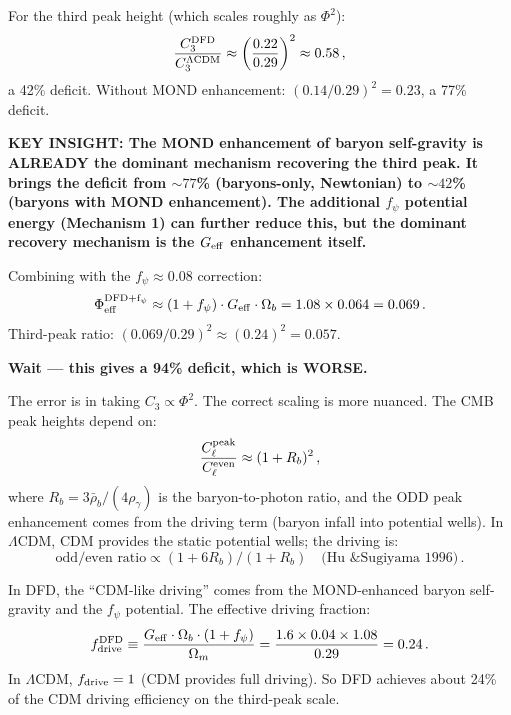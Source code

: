 \documentclass[11pt]{article}
\newcommand{\LCDM}{$\Lambda$CDM}
\newcommand{\Geff}{G_{\rm eff}}
\newcommand{\rhob}{\bar{\rho}_b}
\newcommand{\Ob}{\Omega_b}
\newcommand{\Om}{\Omega_m}
\begin{document}
For the third peak height (which scales roughly as $\Phi^2$):
\begin{equation}
\frac{C_3^{\rm DFD}}{C_3^{\Lambda\rm CDM}}
\approx \left(\frac{0.22}{0.29}\right)^2 \approx 0.58\,,
\end{equation}
a 42\% deficit.  Without MOND enhancement: $(0.14/0.29)^2 = 0.23$,
a 77\% deficit.

\textbf{KEY INSIGHT:  The MOND enhancement of baryon self-gravity is
ALREADY the dominant mechanism recovering the third peak.  It brings the
deficit from $\sim 77$\% (baryons-only, Newtonian) to $\sim 42$\%
(baryons with MOND enhancement).  The additional $f_\psi$ potential
energy (Mechanism 1) can further reduce this, but the dominant recovery
mechanism is the $\Geff$ enhancement itself.}

Combining with the $f_\psi \approx 0.08$ correction:
\begin{equation}
\Phi_{\rm eff}^{\rm DFD+f_\psi}
\approx (1 + f_\psi)\cdot\Geff\cdot\Ob
= 1.08 \times 0.064 = 0.069\,.
\end{equation}
Third-peak ratio: $(0.069/0.29)^2 \approx (0.24)^2 = 0.057$.

\textbf{Wait --- this gives a 94\% deficit, which is WORSE.}

The error is in taking $C_3 \propto \Phi^2$.  The correct scaling is more
nuanced.  The CMB peak heights depend on:
\begin{equation}
\frac{C_\ell^{\rm peak}}{C_\ell^{\rm even}} \approx (1 + R_b)^2\,,
\end{equation}
where $R_b = 3\rhob/(4\rho_\gamma)$ is the baryon-to-photon ratio, and
the ODD peak enhancement comes from the driving term (baryon infall into
potential wells).  In \LCDM, CDM provides the static potential wells;
the driving is:
\begin{equation}
\text{odd/even ratio} \propto (1 + 6R_b)/(1 + R_b)
\quad \text{(Hu \& Sugiyama 1996)}\,.
\end{equation}

In DFD, the ``CDM-like driving'' comes from the MOND-enhanced baryon
self-gravity and the $f_\psi$ potential.  The effective driving fraction:
\begin{equation}
f_{\rm drive}^{\rm DFD} \equiv \frac{\Geff\cdot\Ob\cdot(1+f_\psi)}{\Om}
= \frac{1.6 \times 0.04 \times 1.08}{0.29} = 0.24\,.
\end{equation}
In \LCDM, $f_{\rm drive} = 1$ (CDM provides full driving).  So DFD
achieves about 24\% of the CDM driving efficiency on the third-peak scale.
\end{document}
